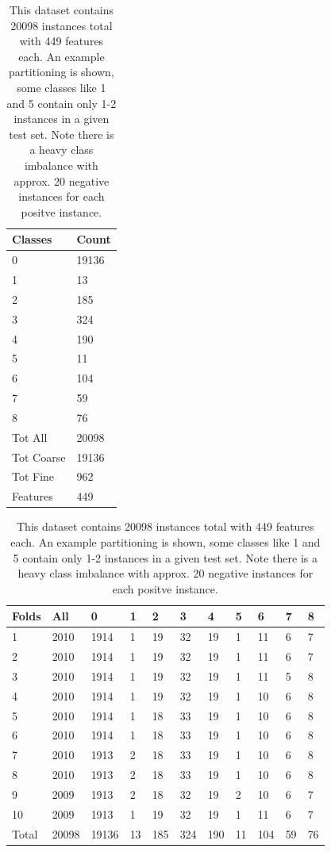 \documentclass[ms]{nuthesis}
\begin{document}
\FloatBarrier
\begin{table}[!htb]
\centering
\begin{subtable}{.25\linewidth}
  \centering
  \begin{tabular}{|l||l|}\toprule
    Classes & Count \\ \midrule
    0 & 19136 \\
    1 & 13 \\
    2 & 185 \\
    3 & 324 \\
    4 & 190 \\
    5 & 11 \\
    6 & 104 \\
    7 & 59 \\
    8 & 76 \\ \midrule
    Tot All & 20098 \\
    Tot Coarse & 19136 \\
    Tot Fine & 962 \\
    Features & 449 \\ \bottomrule
  \end{tabular}
  \caption{Classes}
  \label{tab:ClassesAll}
\end{subtable}%
\begin{subtable}{.75\linewidth}
\centering
  \begin{tabular}{|l||l||l||l||l||l||l||l||l||l||l|}\toprule
    Folds & All & 0 & 1 & 2 & 3 & 4 & 5 & 6 & 7 & 8 \\ \midrule
    1 & 2010 & 1914 & 1 & 19 & 32 & 19 & 1 & 11 & 6 & 7 \\
    2 & 2010 & 1914 & 1 & 19 & 32 & 19 & 1 & 11 & 6 & 7 \\
    3 & 2010 & 1914 & 1 & 19 & 32 & 19 & 1 & 11 & 5 & 8 \\
    4 & 2010 & 1914 & 1 & 19 & 32 & 19 & 1 & 10 & 6 & 8 \\
    5 & 2010 & 1914 & 1 & 18 & 33 & 19 & 1 & 10 & 6 & 8 \\
    6 & 2010 & 1914 & 1 & 18 & 33 & 19 & 1 & 10 & 6 & 8 \\
    7 & 2010 & 1913 & 2 & 18 & 33 & 19 & 1 & 10 & 6 & 8 \\
    8 & 2010 & 1913 & 2 & 18 & 33 & 19 & 1 & 10 & 6 & 8 \\
    9 & 2009 & 1913 & 2 & 18 & 32 & 19 & 2 & 10 & 6 & 7 \\
    10 & 2009 & 1913 & 1 & 19 & 32 & 19 & 1 & 11 & 6 & 7 \\ \midrule
    Total & 20098 & 19136 & 13 & 185 & 324 & 190 & 11 & 104 & 59 & 76 \\
 \bottomrule
  \end{tabular}
  \caption{Folds}
  \label{tab:partitions}
  \end{subtable}
  \caption{This dataset contains 20098 instances total with 449 features each. An example partitioning is shown, some classes
  like 1 and 5 contain only 1-2 instances in a given test set. Note there is a heavy class imbalance with approx. 20 negative
  instances for each positve instance.}
  \label{tab:dataset}
\end{table}
\FloatBarrier
\end{document}
